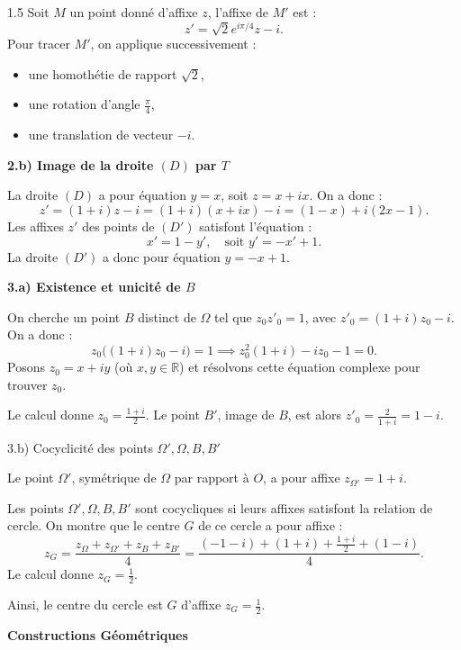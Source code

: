\documentclass[12pt]{article}
\begin{document}
\begin{spacing}{1.5}
Soit \(M\) un point donné d'affixe \(z\), l'affixe de \(M'\) est :
\[
z' = \sqrt{2}e^{i\pi/4}z - i.
\]
Pour tracer \(M'\), on applique successivement :
\begin{itemize}
    \item une homothétie de rapport \(\sqrt{2}\),
    \item une rotation d'angle \(\frac{\pi}{4}\),
    \item une translation de vecteur \(-i\).
\end{itemize}

\textbf{2.b) Image de la droite \((D)\) par \(T\)}

La droite \((D)\) a pour équation \(y = x\), soit \(z = x + ix\). On a donc :
\[
z' = (1+i)z - i = (1+i)(x + ix) - i = (1 - x) + i(2x - 1).
\]
Les affixes \(z'\) des points de \((D')\) satisfont l'équation :
\[
x' = 1 - y', \quad \text{soit } y' = -x' + 1.
\]
La droite \((D')\) a donc pour équation \(y = -x + 1\).

\medskip
\textbf{3.a) Existence et unicité de \(B\)}

On cherche un point \(B\) distinct de \(\Omega\) tel que \(z_0z'_0 = 1\), avec \(z'_0 = (1+i)z_0 - i\). On a donc :
\[
z_0 \big((1+i)z_0 - i\big) = 1 \implies z_0^2(1+i) - iz_0 - 1 = 0.
\]
Posons \(z_0 = x + iy\) (où \(x, y \in \mathbb{R}\)) et résolvons cette équation complexe pour trouver \(z_0\). 

Le calcul donne \(z_0 = \frac{1 + i}{2}\). Le point \(B'\), image de \(B\), est alors \(z'_0 = \frac{2}{1+i} = 1 - i\).

\medskip
3.b) Cocyclicité des points \(\Omega', \Omega, B, B'\)

Le point \(\Omega'\), symétrique de \(\Omega\) par rapport à \(O\), a pour affixe \(z_{\Omega'} = 1 + i\).

Les points \(\Omega', \Omega, B, B'\) sont cocycliques si leurs affixes satisfont la relation de cercle. On montre que le centre \(G\) de ce cercle a pour affixe :
\[
z_G = \frac{z_\Omega + z_{\Omega'} + z_B + z_{B'}}{4} = \frac{(-1-i) + (1+i) + \frac{1+i}{2} + (1-i)}{4}.
\]
Le calcul donne \(z_G = \frac{1}{2}\).

Ainsi, le centre du cercle est \(G\) d'affixe \(z_G = \frac{1}{2}\).









\begin{center}
\textbf{Constructions Géométriques}



\end{center}
\end{spacing}
\end{document}
